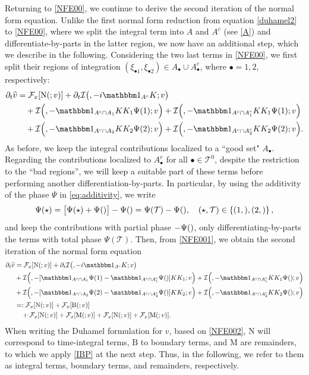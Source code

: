 \documentclass[a4paper,
11pt,  reqno]{amsart}
\makeatletter
\newcommand{\5}{\textup{V}}
\newcommand{\ft}{\widehat}
\newcommand{\ind}{\mathbbm 1}
\newcommand{\dt}{\partial_t}
\theoremstyle{remark}
\newcommand{\bul}{\bullet}
\newcommand{\TT}{\mathcal{T}}
\newcommand{\Ft}{{\mathcal{F}}}
\def\<#1>{\csname MH@symb@#1\endcsname}
\newcommand{\Ical}{\mathcal{I}}
\numberwithin{equation}{section}
\numberwithin{theorem}{section}
\newcommand{\MM}{\mathrm{M}}
\newcommand{\NN}{\mathrm{N}}
\newcommand{\BB}{\mathrm{B}}
\makeatother
\begin{document}
Returning to \eqref{NFE00}, we continue to derive the second iteration of the normal form equation. 
Unlike the first normal form reduction from equation \eqref{duhamel2} to \eqref{NFE00}, where we split the integral term into $A$ and $A^c$ (see \eqref{A}) and differentiate-by-parts in the latter region, we now have an additional step, which we describe in the following. Considering the two last terms in \eqref{NFE00}, we first split their regions of integration $(\xi_{\bul1}, \xi_{\bul2}) \in A_\bul \cup A_\bul^c$, where $\bul = 1,2$, respectively:
\begin{align}
\label{NFE001}
\dt\ft v
&
= 
 \Ft_x[ \NN ( \<1>; v )]  
+ 
\dt \Ical \big( \<1>, -i  \ind_{A^c} K; v \big)
\\
&
\quad 
+
\Ical \Big( \<21>, - \ind_{A^c \cap A_1} KK_1\Psi(1) ; v  \Big)  
+
\Ical \Big( \<21>, - \ind_{A^c \cap A_1^c} KK_1\Psi(1) ; v  \Big) 
\\
&
\quad 
+
\Ical \Big( \<22>, - \ind_{A^c \cap A_2} KK_2\Psi(2) ; v  \Big) 
+
\Ical \Big( \<22>, - \ind_{A^c \cap A_2^c} KK_2\Psi(2) ; v  \Big) .
\end{align}
As before, we keep the integral contributions localized to a ``good set" $A_\bul$. Regarding the contributions localized to $A_\bul^c$ for all $\bul\in \TT^0$, despite the restriction to the ``bad regions'', we will keep a suitable part of these terms before performing another differentiation-by-parts. In particular, by using the additivity of the phase $\Psi$ in \eqref{eq:additivity}, we write
\begin{align}
\Psi(\star) 
= \big[ \Psi(\star) + \Psi(\<1>) \big]- \Psi(\<1>) 
=
\Psi(\TT) - \Psi(\<1>),
\quad (\star, \TT)\in \left\{ (1, \<21>) , (2, \<22>) \right\},
\end{align}
and keep the contributions with partial phase $-\Psi(\<1>)$, only differentiating-by-parts the terms with total phase $\Psi(\TT)$. Then, from \eqref{NFE001}, we obtain the second iteration of the normal form equation
\begin{align}
\dt\ft v
&
= 
 \Ft_x[ \NN ( \<1>; v )] 
+ 
\dt \Ical \big( \<1>, - i  \ind_{A^c} K; v \big)
\\
&
+
\Ical \Big( \<21>, -[ \ind_{A^c \cap A_1} \Psi(1) - \ind_{A^c \cap A_1^c} \Psi(\<1>)  ]KK_1 ; v  \Big) 
+
\Ical \Big( \<21>, - \ind_{A^c \cap A_1^c} KK_1\Psi(\<21>) ; v  \Big) 
\\
&
+
\Ical \Big( \<22>, - [\ind_{A^c \cap A_2} \Psi(2) - \ind_{A^c \cap A_2^c} \Psi(\<1>)  ] KK_2; v  \Big) 
+
\Ical \Big( \<22>, - \ind_{A^c \cap A_2^c} KK_2\Psi(\<22>) ; v  \Big) 
\\
&
= : 
 \Ft_x[ \NN ( \<1>; v )]  
+ 
 \Ft_x[ 
\BB(\<1>;v)
] 
\\
&
\quad 
+ 
 \Ft_x[ 
\NN(\<21>; v )
] 
+
 \Ft_x[ 
\MM(\<21>; v )
] 
+
 \Ft_x[ 
\NN(\<22>; v)
]  
+
 \Ft_x[ 
\MM(\<22>;v)
]  
.
\label{NFE002}
\end{align}
When writing the Duhamel formulation for $v$, based on \eqref{NFE002}, $\NN$ will correspond to time-integral terms, $\BB$ to boundary terms, and $\MM$ are remainders, to which we apply \eqref{IBP} at the next step. Thus, in the following, we refer to them as integral terms, boundary terms, and remainders, respectively.
\end{document}
